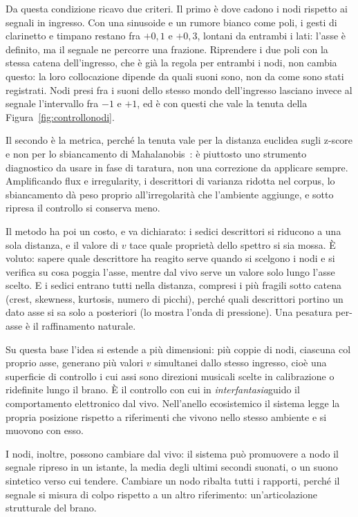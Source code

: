 \documentclass{article}
\newcommand{\brano}{\emph{interfantasia}}
\begin{document}
Da questa condizione ricavo due criteri. Il primo è dove cadono i nodi rispetto ai segnali in ingresso. Con una sinusoide e un rumore bianco come poli, i gesti di clarinetto e timpano restano fra $+0{,}1$ e $+0{,}3$, lontani da entrambi i lati: l'asse è definito, ma il segnale ne percorre una frazione. Riprendere i due poli con la stessa catena dell'ingresso, che è già la regola per entrambi i nodi, non cambia questo: la loro collocazione dipende da quali suoni sono, non da come sono stati registrati. Nodi presi fra i suoni dello stesso mondo dell'ingresso lasciano invece al segnale l'intervallo fra $-1$ e $+1$, ed è con questi che vale la tenuta della Figura~\ref{fig:controllonodi}.

Il secondo è la metrica, perché la tenuta vale per la distanza euclidea sugli z-score e non per lo sbiancamento di Mahalanobis~\cite{mahalanobis1936generalised}: è piuttosto uno strumento diagnostico da usare in fase di taratura, non una correzione da applicare sempre. Amplificando flux e irregularity, i descrittori di varianza ridotta nel corpus, lo sbiancamento dà peso proprio all'irregolarità che l'ambiente aggiunge, e sotto ripresa il controllo si conserva meno.

Il metodo ha poi un costo, e va dichiarato: i sedici descrittori si riducono a una sola distanza, e il valore di $v$ tace quale proprietà dello spettro si sia mossa. È voluto: sapere quale descrittore ha reagito serve quando si scelgono i nodi e si verifica su cosa poggia l'asse, mentre dal vivo serve un valore solo lungo l'asse scelto. E i sedici entrano tutti nella distanza, compresi i più fragili sotto catena (crest, skewness, kurtosis, numero di picchi), perché quali descrittori portino un dato asse si sa solo a posteriori (lo mostra l'onda di pressione). Una pesatura per-asse è il raffinamento naturale.

Su questa base l'idea si estende a più dimensioni: più coppie di nodi, ciascuna col proprio asse, generano più valori $v$ simultanei dallo stesso ingresso, cioè una superficie di controllo i cui assi sono direzioni musicali scelte in calibrazione o ridefinite lungo il brano. È il controllo con cui in \brano guido il comportamento elettronico dal vivo. Nell'anello ecosistemico il sistema legge la propria posizione rispetto a riferimenti che vivono nello stesso ambiente e si muovono con esso.

I nodi, inoltre, possono cambiare dal vivo: il sistema può promuovere a nodo il segnale ripreso in un istante, la media degli ultimi secondi suonati, o un suono sintetico verso cui tendere. Cambiare un nodo ribalta tutti i rapporti, perché il segnale si misura di colpo rispetto a un altro riferimento: un'articolazione strutturale del brano.
\end{document}
